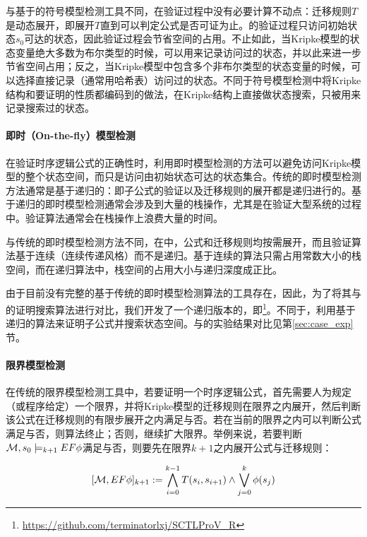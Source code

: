 与基于\BDD{}的符号模型检测工具不同，\sctlprov{}在验证过程中没有必要计算不动点：迁移规则$T$是动态展开，即展开$T$直到可以判定公式是否可证为止。\sctlprov{}的验证过程只访问初始状态$s_0$可达的状态，因此验证过程会节省空间的占用。不止如此，当Kripke模型的状态变量绝大多数为布尔类型的时候，\sctlprov{}可以用\BDD{}来记录访问过的状态，并以此来进一步节省空间占用；反之，当Kripke模型中包含多个非布尔类型的状态变量的时候，\sctlprov{}可以选择直接记录（通常用哈希表）访问过的状态。不同于符号模型检测中将Kripke结构和要证明的性质都编码到\BDD{}的做法，\sctlprov{}在Kripke结构上直接做状态搜索，\BDD{}只被用来记录搜索过的状态。

\paragraph{即时（On-the-fly）模型检测}
在验证时序逻辑公式的正确性时，利用即时模型检测的方法可以避免访问Kripke模型的整个状态空间，而只是访问由初始状态可达的状态集合。传统的\CTL{}即时模型检测方法\cite{VergauwenL93,BCG95}通常是基于递归的：即子公式的验证以及迁移规则的展开都是递归进行的。基于递归的\CTL{}即时模型检测通常会涉及到大量的栈操作，尤其是在验证大型系统的过程中。验证算法通常会在栈操作上浪费大量的时间。

与传统的\CTL{}即时模型检测方法不同，在\sctlprov{}中，公式和迁移规则均按需展开，而且验证算法基于连续（连续传递风格）而不是递归。基于连续的算法只需占用常数大小的栈空间\cite{Reynolds93,Appel06,Sestoft12}，而在递归算法中，栈空间的占用大小与递归深度成正比。

由于目前没有完整的基于传统的即时模型检测算法的工具存在，因此，为了将其与\sctlprov{}的证明搜索算法进行对比，我们开发了一个递归版本的\sctlprov{}，即\sctlprovr{}\footnote{\url{https://github.com/terminatorlxj/SCTLProV_R}}。不同于\sctlprov{}，\sctlprovr{}利用基于递归的算法来证明子公式并搜索状态空间。\sctlprov{}与\sctlprovr{}的实验结果对比见第\ref{sec:case_exp}节。

\paragraph{限界模型检测}
在传统的限界模型检测工具中，若要证明一个时序逻辑公式，首先需要人为规定（或程序给定）一个限界，并将Kripke模型的迁移规则在限界之内展开，然后判断该公式在迁移规则的有限步展开之内满足与否。若在当前的限界之内可以判断公式满足与否，则算法终止；否则，继续扩大限界。举例来说，若要判断${\cal M}, s_0 \models_{k+1} EF\phi$满足与否，则要先在限界$k+1$之内展开公式与迁移规则\cite{BCCZ99}：

\begin{small}
	$$ [{\cal M},EF\phi]_{k+1} := \bigwedge^{k-1}_{i=0}T(s_i,s_{i+1}) \wedge \bigvee_{j=0}^k\phi(s_j)$$
\end{small}


